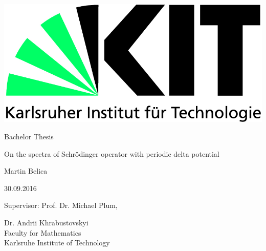 \begin{titlepage}
  \includegraphics[scale=0.45]{kit-logo.jpg}
  \vspace*{2cm} 

  \begin{center} \large 
    
    Bachelor Thesis
    \vspace*{2cm}

    {\huge On the spectra of Schrödinger operator with periodic delta potential}
    \vspace*{2.5cm}

    Martin Belica
    \vspace*{0.125cm}

    30.09.2016
    \vspace*{4.25cm}


    Supervisor: Prof. Dr. Michael Plum,
    \vspace*{0.125cm}
    
    Dr. Andrii Khrabustovskyi \\[1cm]
    Faculty for Mathematics \\[1cm]
	Karlsruhe Institute of Technology
  \end{center}
\end{titlepage}